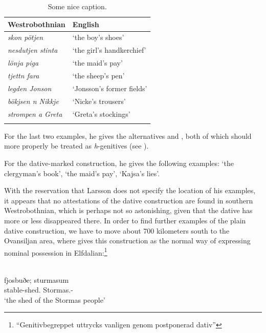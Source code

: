 \begin{table}
\begin{tabular}{ll}
\lsptoprule Westrobothnian & English \\
\midrule 
\textit{skon pötjen} & ‘the boy’s shoes’\\ 
\textit{nesdutjen stinta} & ‘the girl’s handkerchief’\\ 
\textit{lönja piga} & ‘the maid’s pay’\\ 
\textit{tjettn fara} & ‘the sheep’s pen’\\ 
\textit{legden Jonson} & ‘Jonsson’s former fields’\\ 
\textit{bökjsen n Nikkje} & ‘Nicke’s trousers’\\ 
\textit{strompen a Greta} & ‘Greta’s stockings’\\
\lspbottomrule
\end{tabular}
\caption{Some nice caption.}
\label{tab:5.1}
\end{table} 


For the last two examples, he gives the alternatives  and , both of which should more properly be treated as \textit{h}{}-genitives (see ).

For the dative-marked construction, he gives the following examples:  ‘the clergyman’s book’,  ‘the maid’s pay’, ‘Kajsa’s lies’. 

With the reservation that Larsson does not specify the location of his examples, it appears that no attestations of the dative construction are found in southern Westrobothnian, which is perhaps not so astonishing, given that the dative has more or less disappeared there. In order to find further examples of the plain dative construction, we have to move about 700 kilometers south to the Ovansiljan area, where \citet[97]{Levander1909} gives this construction as the normal way of expressing nominal possession in Elfdalian:\footnote{ “Genitivbegreppet uttrycks vanligen genom postponerad dativ”}

\ea\label{}
\\
\gll fjosbuðe;  sturmasum\\
stable-shed.{}  Stormas.{}-{\pl}\\
\glt ‘the shed of the Stormas people’
\z

